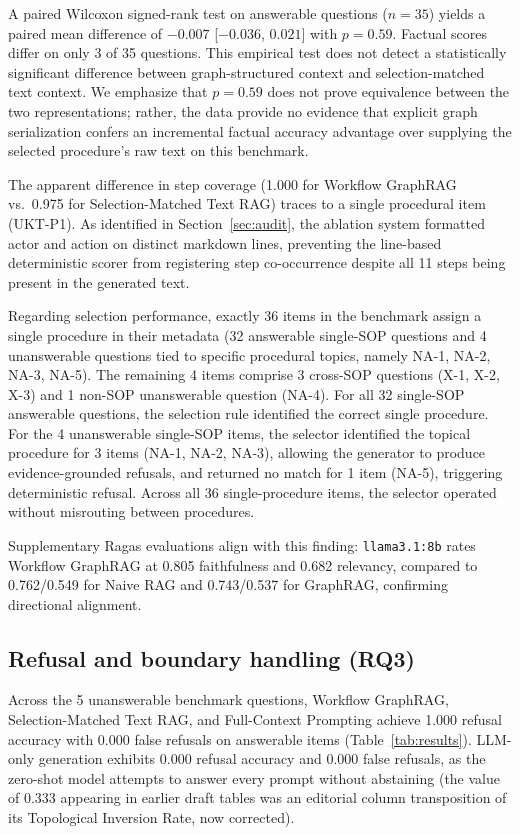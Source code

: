 \documentclass[preprint,10pt]{elsarticle}
\begin{document}
A paired Wilcoxon signed-rank test on answerable questions ($n=35$) yields a paired mean difference of $-0.007$ [$-0.036$, $0.021$] with $p = 0.59$. Factual scores differ on only 3 of 35 questions. This empirical test does not detect a statistically significant difference between graph-structured context and selection-matched text context. We emphasize that $p=0.59$ does not prove equivalence between the two representations; rather, the data provide no evidence that explicit graph serialization confers an incremental factual accuracy advantage over supplying the selected procedure's raw text on this benchmark.

The apparent difference in step coverage (1.000 for Workflow GraphRAG vs.\ 0.975 for Selection-Matched Text RAG) traces to a single procedural item (UKT-P1). As identified in Section~\ref{sec:audit}, the ablation system formatted actor and action on distinct markdown lines, preventing the line-based deterministic scorer from registering step co-occurrence despite all 11 steps being present in the generated text.

Regarding selection performance, exactly 36 items in the benchmark assign a single procedure in their metadata (32 answerable single-SOP questions and 4 unanswerable questions tied to specific procedural topics, namely NA-1, NA-2, NA-3, NA-5). The remaining 4 items comprise 3 cross-SOP questions (X-1, X-2, X-3) and 1 non-SOP unanswerable question (NA-4). For all 32 single-SOP answerable questions, the selection rule identified the correct single procedure. For the 4 unanswerable single-SOP items, the selector identified the topical procedure for 3 items (NA-1, NA-2, NA-3), allowing the generator to produce evidence-grounded refusals, and returned no match for 1 item (NA-5), triggering deterministic refusal. Across all 36 single-procedure items, the selector operated without misrouting between procedures.

Supplementary Ragas evaluations align with this finding: \texttt{llama3.1:8b} rates Workflow GraphRAG at 0.805 faithfulness and 0.682 relevancy, compared to 0.762/0.549 for Naive RAG and 0.743/0.537 for GraphRAG, confirming directional alignment.

\subsection{Refusal and boundary handling (RQ3)}
Across the 5 unanswerable benchmark questions, Workflow GraphRAG, Selection-Matched Text RAG, and Full-Context Prompting achieve 1.000 refusal accuracy with 0.000 false refusals on answerable items (Table~\ref{tab:results}). LLM-only generation exhibits 0.000 refusal accuracy and 0.000 false refusals, as the zero-shot model attempts to answer every prompt without abstaining (the value of 0.333 appearing in earlier draft tables was an editorial column transposition of its Topological Inversion Rate, now corrected).
\end{document}
